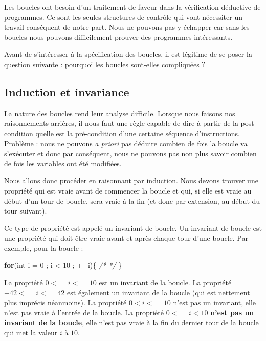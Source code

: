 \documentclass[12pt,francais,]{scrbook}
\newenvironment{Shaded}{}{}
\newcommand{\KeywordTok}[1]{\textcolor[rgb]{0.00,0.44,0.13}{\textbf{{#1}}}}
\newcommand{\DataTypeTok}[1]{\textcolor[rgb]{0.56,0.13,0.00}{{#1}}}
\newcommand{\DecValTok}[1]{\textcolor[rgb]{0.25,0.63,0.44}{{#1}}}
\newcommand{\CommentTok}[1]{\textcolor[rgb]{0.38,0.63,0.69}{\textit{{#1}}}}
\newcommand{\NormalTok}[1]{{#1}}
\begin{document}
Les boucles ont besoin d'un traitement de faveur dans la vérification
déductive de programmes. Ce sont les seules structures de contrôle qui
vont nécessiter un travail conséquent de notre part. Nous ne pouvons pas
y échapper car sans les boucles nous pouvons difficilement prouver des
programmes intéressants.

Avant de s'intéresser à la spécification des boucles, il est légitime de
se poser la question suivante : pourquoi les boucles sont-elles
compliquées ?

\subsection{Induction et invariance}\label{induction-et-invariance}

La nature des boucles rend leur analyse difficile. Lorsque nous faisons
nos raisonnements arrières, il nous faut une règle capable de dire à
partir de la post-condition quelle est la pré-condition d'une certaine
séquence d'instructions. Problème : nous ne pouvons \emph{a priori} pas
déduire combien de fois la boucle va s'exécuter et donc par conséquent,
nous ne pouvons pas non plus savoir combien de fois les variables ont
été modifiées.

Nous allons donc procéder en raisonnant par induction. Nous devons
trouver une propriété qui est vraie avant de commencer la boucle et qui,
si elle est vraie au début d'un tour de boucle, sera vraie à la fin (et
donc par extension, au début du tour suivant).

Ce type de propriété est appelé un invariant de boucle. Un invariant de
boucle est une propriété qui doit être vraie avant et après chaque tour
d'une boucle. Par exemple, pour la boucle :

\begin{footnotesize}\begin{Shaded}
\begin{Highlighting}[]
\KeywordTok{for}\NormalTok{(}\DataTypeTok{int} \NormalTok{i = }\DecValTok{0} \NormalTok{; i < }\DecValTok{10} \NormalTok{; ++i)\{ }\CommentTok{/* */} \NormalTok{\}}
\end{Highlighting}
\end{Shaded}\end{footnotesize}

La propriété \(0 <= i <= 10\) est un invariant de la boucle. La
propriété \(-42 <= i <= 42\) est également un invariant de la boucle
(qui est nettement plus imprécis néanmoins). La propriété
\(0 < i <= 10\) n'est pas un invariant, elle n'est pas vraie à l'entrée
de la boucle. La propriété \(0 <= i < 10\) \textbf{n'est pas un
invariant de la boucle}, elle n'est pas vraie à la fin du dernier tour
de la boucle qui met la valeur \(i\) à \(10\).
\end{document}
